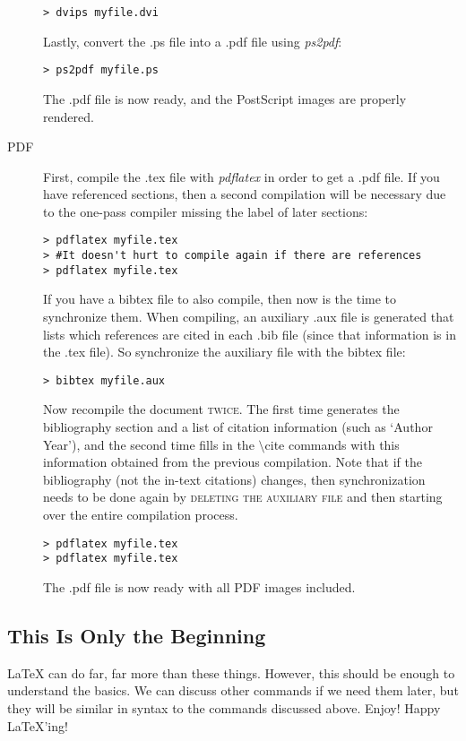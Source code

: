 \documentclass[10pt]{article}
\begin{document}
\begin{description}
\begin{verbatim}
> dvips myfile.dvi
\end{verbatim}
Lastly, convert the .ps file into a .pdf file using \textit{ps2pdf}:
\begin{verbatim}
> ps2pdf myfile.ps
\end{verbatim}
The .pdf file is now ready, and the PostScript images are properly rendered.
\item[PDF] First, compile the .tex file with \textit{pdflatex} in order to get a .pdf file.  If you have referenced sections, then a second compilation will be necessary due to the one-pass compiler missing the label of later sections:
\begin{verbatim}
> pdflatex myfile.tex
> #It doesn't hurt to compile again if there are references
> pdflatex myfile.tex
\end{verbatim}
If you have a bibtex file to also compile, then now is the time to synchronize them.  When compiling, an auxiliary .aux file is generated that lists which references are cited in each .bib file (since that information is in the .tex file).  So synchronize the auxiliary file with the bibtex file:
\begin{verbatim}
> bibtex myfile.aux
\end{verbatim}
Now recompile the document \textsc{twice}.  The first time generates the bibliography section and a list of citation information (such as `Author Year'), and the second time fills in the $ \setminus $cite commands with this information obtained from the previous compilation.  Note that if the bibliography (not the in-text citations) changes, then synchronization needs to be done again by \textsc{deleting the auxiliary file} and then starting over the entire compilation process.
\begin{verbatim}
> pdflatex myfile.tex
> pdflatex myfile.tex
\end{verbatim}
The .pdf file is now ready with all PDF images included.
\end{description}
\subsection{This Is Only the Beginning\label{conclusion}}
LaTeX can do far, far more than these things.  However, this should be enough to understand the basics.  We can discuss other commands if we need them later, but they will be similar in syntax to the commands discussed above.  Enjoy!  Happy LaTeX'ing!
\end{document}
